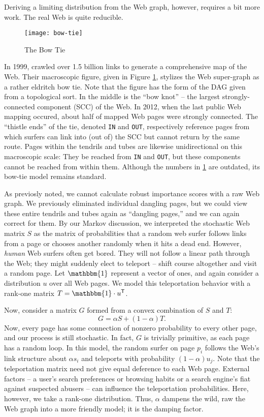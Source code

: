 \documentclass[../exploring-pagerank.tex]{subfiles}
\begin{document}
	Deriving a limiting distribution from the Web graph, however, requires a bit more work. The real Web is quite reducible. 
    \begin{figure}
        \centering
        \texttt{[image: bow-tie]}
        \caption{The Bow Tie \cite{broderGraphStructureWeb}}
        \label{fig:bow-tie}
    \end{figure}
    In 1999, \cite{broderGraphStructureWeb} crawled over 1.5 billion links to generate a comprehensive map of the Web. Their macroscopic figure, given in Figure \ref{fig:bow-tie}, stylizes the Web super-graph as a rather eldritch bow tie. Note that the figure has the form of the DAG given from a topological sort. In the middle is the ``bow knot'' -- the largest strongly-connected component (SCC) of the Web. In 2012, when the last public Web mapping occured, about half of mapped Web pages were strongly connected. The ``thistle ends'' of the tie, denoted \texttt{IN} and \texttt{OUT}, respectively reference pages from which surfers can link into (out of) the SCC but cannot return by the same route. Pages within the tendrils and tubes are likewise unidirectional on this macroscopic scale: They be reached from \texttt{IN} and \texttt{OUT}, but these components cannot be reached from within them. Although the numbers in \ref{fig:bow-tie} are outdated, its bow-tie model remains standard. 
    
    As previosly noted, we cannot calculate robust importance scores with a raw Web graph. We previously eliminated individual dangling pages, but we could view these entire tendrils and tubes again as ``dangling pages,'' and we can again correct for them. By our Markov discussion, we interpreted the stochastic Web matrix $S$ as the matrix of probabilities that a random web surfer follows links from a page or chooses another randomly when it hits a dead end. However, \textit{human} Web surfers often get bored. They will not follow a linear path through the Web; they might suddenly elect to teleport -- shift course altogether and visit a random page.
    Let $\mathbbm{1}$ represent a vector of ones, and again consider a distribution $u$ over all Web pages. We model this teleportation behavior with a rank-one matrix $T = \mathbbm{1} \cdot \transpose{u}$.
    
    Now, consider a matrix $G$ formed from a convex combination of $S$ and $T$:
	\begin{equation}
	    \label{eqn:google_matrix}
		G = \alpha S + (1-\alpha)T.
	\end{equation}
	Now, every page has some connection of nonzero probability to every other page, and our process is still stochastic. In fact, $G$ is trivially primitive, as each page has a random loop. In this model, the random surfer on page $p_i$ follows the Web's link structure about $\alpha s_i$ and teleports with probability $(1-\alpha) u_j$. Note that the teleportation matrix need not give equal deference to each Web page. External factors -- a user's search preferences or browsing habits or a search engine's fiat against suspected abusers -- can influence the teleportation probabilities. Here, however, we take a rank-one distribution. Thus, $\alpha$ dampens the wild, raw the Web graph into a more friendly model; it is the damping factor.
	
\end{document}
